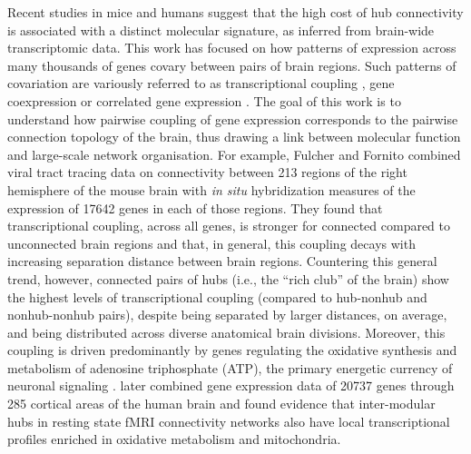 Recent studies in mice and humans suggest that the high cost of hub connectivity is associated with a distinct
molecular signature, as inferred from brain-wide transcriptomic data.
This work has focused on how patterns of expression across many thousands of genes covary between pairs of brain regions.
Such patterns of covariation are variously referred to as transcriptional coupling \citep{Fulcher2016}, gene coexpression \citep{Krienen2016} or correlated gene expression \citep{Richiardi2015, Mills2018, Goel2014}.
The goal of this work is to understand how pairwise coupling of gene expression corresponds to the pairwise connection topology of the brain, thus drawing a link between molecular function and large-scale network organisation.
For example, Fulcher and Fornito \citep{Fulcher2016} combined viral tract tracing data on connectivity between 213 regions of the right hemisphere of the mouse brain \citep{Oh2014} with \emph{in situ} hybridization measures of the expression of \num{17642} genes in each of those regions.
They found that transcriptional coupling, across all genes, is stronger for connected compared to unconnected brain regions and that, in general, this coupling decays with increasing separation distance between brain regions.
Countering this general trend, however, connected pairs of hubs (i.e., the ``rich club'' of the brain) show the highest levels of transcriptional coupling (compared to hub-nonhub and nonhub-nonhub pairs), despite being separated by larger distances, on average, and being distributed across diverse anatomical brain divisions.
Moreover, this coupling is driven predominantly by genes regulating the oxidative synthesis and metabolism of adenosine triphosphate (ATP), the primary energetic currency of neuronal signaling \citep{Lennie2003, Laughlin2003}. \mbox{\citet{Vertes2016b}} later combined gene expression data of \num{20737} genes through 285 cortical areas of the human brain and found evidence that inter-modular hubs in resting state fMRI connectivity networks also have local transcriptional profiles enriched in oxidative metabolism and mitochondria.

